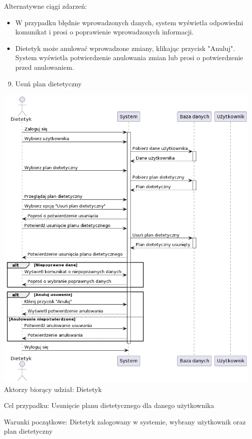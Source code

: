 {Alternatywne ciągi zdarzeń:}

\begin{itemize}
\tightlist
\item
  {W przypadku błędnie wprowadzonych danych, system wyświetla odpowiedni
  komunikat i prosi o poprawienie wprowadzonych informacji.}
\item
  {Dietetyk może anulować wprowadzone zmiany, klikając przycisk
  "Anuluj". System wyświetla potwierdzenie anulowania zmian lub prosi o
  potwierdzenie przed anulowaniem.}
\end{itemize}

{}

\begin{enumerate}
\setcounter{enumi}{8}
\tightlist
\item
  {Usuń plan dietetyczny}
\end{enumerate}

{\includegraphics{diagrams/sequence/dietetyk_usun_plan}}
{Aktorzy biorący udział: Dietetyk}

{Cel przypadku: Usunięcie planu dietetycznego dla danego użytkownika}

{Warunki początkowe: Dietetyk zalogowany w systemie, wybrany użytkownik
oraz plan dietetyczny}

